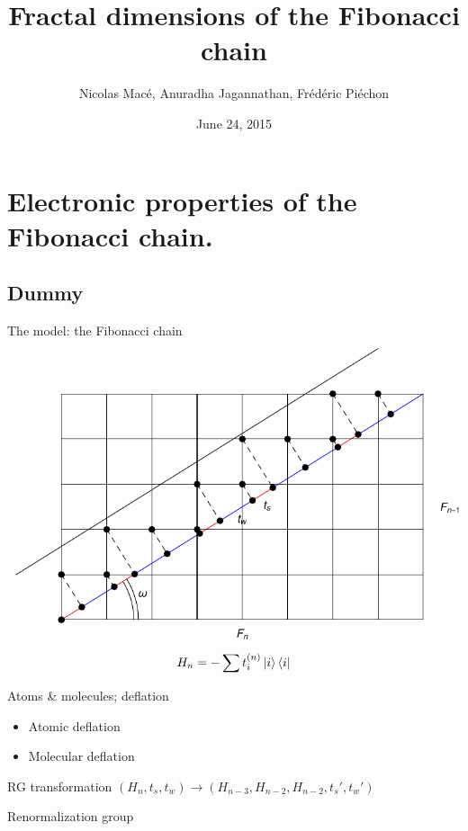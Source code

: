 \documentclass[xcolor=x11names,compress,professionalfonts]{beamer}
\renewcommand{\(}{\begin{columns}}
\renewcommand{\)}{\end{columns}}
\newcommand{\<}[1]{\begin{column}{#1}}
\renewcommand{\>}{\end{column}}
\newcommand{\ham}{\ensuremath{H}}
\begin{document}
\begin{frame}
\title{Fractal dimensions of the Fibonacci chain}
\author{ Nicolas Macé, Anuradha Jagannathan, Frédéric Piéchon }
\date{
	June 24, 2015
}
\titlepage
\end{frame}

\section{Electronic properties of the Fibonacci chain.}
\subsection{Dummy}

\begin{frame}{The model: the Fibonacci chain}
	\centering
	\includegraphics[scale=.7]{cut_and_project.pdf}
	\[ \ham_n = - \sum t_i^{(n)} \ket{i} \bra{i} \]
\end{frame}

\begin{frame}{Atoms \& molecules; deflation}
	\centering
	\begin{itemize}
	\item Atomic deflation 
	\item Molecular deflation 
	\end{itemize}
	RG transformation $(\ham_n, t_s, t_w) \rightarrow (\ham_{n-3}, \ham_{n-2}, \ham_{n-2}, t_s', t_w')$
\end{frame}

\begin{frame}{Renormalization group}
\end{frame}
\end{document}
